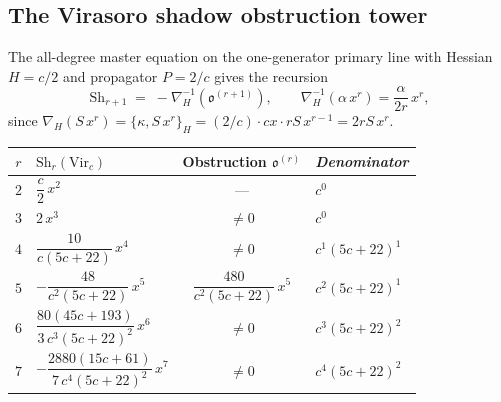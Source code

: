 
\subsection{The Virasoro shadow obstruction tower}
\label{subsec:thqg-virasoro-tower}

The all-degree master equation on the one-generator primary line
with Hessian $H = c/2$ and propagator $P = 2/c$ gives the
recursion
\begin{equation}\label{eq:thqg-master-recursion}
\mathrm{Sh}_{r+1}
\;=\;
-\nabla_H^{-1}(\mathfrak{o}^{(r+1)}),
\qquad
\nabla_H^{-1}(\alpha\,x^r)
= \frac{\alpha}{2r}\,x^r,
\end{equation}
since $\nabla_H(S\,x^r) = \{\kappa, S\,x^r\}_H =
(2/c)\cdot cx \cdot rS\,x^{r-1} = 2rS\,x^r$.

\begin{theorem}
\label{thm:thqg-virasoro-tower-explicit}
\ClaimStatusProvedHere
{}
\begin{center}
\small
\renewcommand{\arraystretch}{1.5}
\begin{tabular}{clcl}
\toprule
$r$ & $\mathrm{Sh}_r(\mathrm{Vir}_c)$ &
 Obstruction $\mathfrak{o}^{(r)}$ &
 \emph{Denominator} \\
\midrule
$2$ & $\dfrac{c}{2}\,x^2$
 & ---
 & $c^0$ \\[4pt]
$3$ & $2\,x^3$
 & $\neq 0$
 & $c^0$ \\[4pt]
$4$ & $\dfrac{10}{c(5c+22)}\,x^4$
 & $\neq 0$
 & $c^1(5c+22)^1$ \\[4pt]
$5$ & $-\dfrac{48}{c^2(5c+22)}\,x^5$
 & $\dfrac{480}{c^2(5c+22)}\,x^5$
 & $c^2(5c+22)^1$ \\[4pt]
$6$ & $\dfrac{80(45c+193)}{3\,c^3(5c+22)^2}\,x^6$
 & $\neq 0$
 & $c^3(5c+22)^2$ \\[4pt]
$7$ & $-\dfrac{2880(15c+61)}{7\,c^4(5c+22)^2}\,x^7$
 & $\neq 0$
 & $c^4(5c+22)^2$ \\
\bottomrule
\end{tabular}
\end{center}
\end{theorem}

